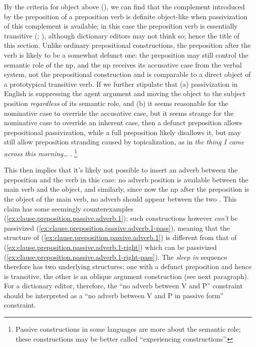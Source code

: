 \documentclass[UTF8, a4paper, oneside, scheme=plain, 12pt]{ctexbook}
\newcommand*{\citepage}[1]{p.~{#1}}
\newcommand{\form}[1]{\emph{#1}}
\begin{document}
By the criteria for object above (),
we can find that the complement introduced by the preposition of a preposition verb 
is definite object-like
when passivization of this complement is available; 
in this case the preposition verb is essentially transitive
(\citealt[\citepage{291}, \citepage{297}]{dixon2005semantic};
\citealt[\citepage{277}]{cgel}),
although dictionary editors may not think so;
hence the title of this section.
Unlike ordinary prepositional constructions, 
the preposition after the verb 
is likely to be a somewhat defunct one: 
the preposition may still control the semantic role of the \acs{np}, 
and the \acs{np} receives its accusative case from the verbal system, 
not the prepositional construction 
and is comparable to a direct object of a prototypical transitive verb.
If we further stipulate that 
(a) passivization in English is suppressing the agent argument and 
moving the object to the subject position \emph{regardless} of its semantic role, and 
(b) it seems reasonable for the nominative case to override the accusative case, 
but it seems strange for the nominative case to override an inherent case, 
then a defunct preposition allows prepositional passivization, 
while a full preposition likely disallows it, 
but may still allow preposition stranding caused by topicalization, 
as in \form{the thing I came across this morning\dots}
\citep{richards2017multiple}.%
\footnote{
    Passive constructions in some languages are more about the semantic role; 
    these constructions may be better called ``experiencing constructions''.
}


This then implies that it's likely not possible to insert an adverb 
between the preposition and the verb in this case: 
no adverb position is available between the main verb and the object, 
and similarly, since now the \acs{np} after the preposition 
is the object of the main verb, 
no adverb should appear between the two \citep{richards2017multiple}.
This claim has some seemingly counterexamples (\ref{ex:clause.preposition.passive.adverb.1});
such constructions however \emph{can't} be passivized 
(\ref{ex:clause.preposition.passive.adverb.1-pass}), 
meaning that the structure of (\ref{ex:clause.preposition.passive.adverb.1})
is different from that of (\ref{ex:clause.preposition.passive.adverb.1-right})
which can be passivized (\ref{ex:clause.preposition.passive.adverb.1-right-pass}).
The \form{sleep in} sequence therefore has two underlying structures: 
one with a defunct preposition and hence is transitive, 
the other is an oblique argument construction (see next paragraph).
For a dictionary editor, therefore, 
the ``no adverb between V and P'' constraint 
should be interpreted as a ``no adverb between V and P in passive form'' constraint.
\end{document}
